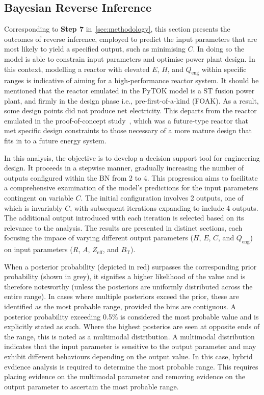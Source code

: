 \documentclass[journal]{IEEEtran}
\begin{document}
\subsection{\textbf{Bayesian Reverse Inference}}\label{sec:res_reverse}

Corresponding to \textbf{Step 7} in~\ref{sec:methodology}, this section presents the outcomes of reverse inference, employed to predict the input parameters that are most likely to yield a specified output, such as minimising $C$. In doing so the model is able to constrain input parameters and optimise power plant design. In this context, modelling a reactor with elevated $E$, $H$, and $Q_{\text{eng}}$ within specific ranges is indicative of aiming for a high-performance reactor system. It should be mentioned that the reactor emulated in the PyTOK model is a ST fusion power plant, and firmly in the design phase i.e., pre-first-of-a-kind (FOAK). As a result, some design points did not produce net electricity. This departs from the reactor emulated in the proof-of-concept study~\cite{Griffiths2024}, which was a future-type reactor that met specific design constraints to those necessary of a more mature design that fits in to a future energy system. 

In this analysis, the objective is to develop a decision support tool for engineering design. It proceeds in a stepwise manner, gradually increasing the number of outputs configured within the BN from 2 to 4. This progression aims to facilitate a comprehensive examination of the model's predictions for the input parameters contingent on variable $C$. The initial configuration involves 2 outputs, one of which is invariably $C$, with subsequent iterations expanding to include 4 outputs. The additional output introduced with each iteration is selected based on its relevance to the analysis. The results are presented in distinct sections, each focusing the impace of varying different output parameters ($H$, $E$, $C$, and $Q_{\text{eng}}$) on input parameters ($R$, $A$, $Z_{\text{eff}}$, and $B_{\text{T}}$).

When a posterior probability (depicted in red) surpasses the corresponding prior probability (shown in grey), it signifies a higher likelihood of the value and is therefore noteworthy (unless the posteriors are uniformly distributed across the entire range). In cases where multiple posteriors exceed the prior, these are identified as the most probable range, provided the bins are contiguous. A posterior probability exceeding 0.5\% is considered the most probable value and is explicitly stated as such. Where the highest posterios are seen at opposite ends of the range, this is noted as a multimodal distribution. A multimodal distribution indicates that the input parameter is sensitive to the output parameter and may exhibit different behaviours depending on the output value. In this case, hybrid evdience analysis is required to determine the most probable range. This requires placing evidence on the multimodal parameter and removing evidence on the output parameter to ascertain the most probable range.   
\end{document}
